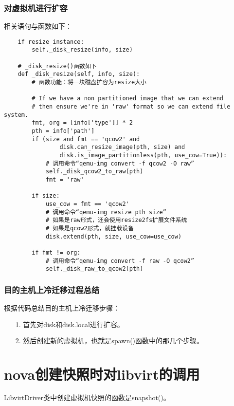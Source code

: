 \documentclass[a4paper,left=1.5cm,right=1.5cm,11pt]{article}
\begin{document}
\subsubsection{对虚拟机进行扩容}
	相关语句与函数如下：
	\begin{lstlisting}
	if resize_instance:
		self._disk_resize(info, size)

	# _disk_resize()函数如下
	def _disk_resize(self, info, size):
        # 函数功能：将一块磁盘扩容为resize大小

		# If we have a non partitioned image that we can extend
        # then ensure we're in 'raw' format so we can extend file system.
        fmt, org = [info['type']] * 2
        pth = info['path']
        if (size and fmt == 'qcow2' and
                disk.can_resize_image(pth, size) and
                disk.is_image_partitionless(pth, use_cow=True)):
			# 调用命令“qemu-img convert -f qcow2 -O raw”
            self._disk_qcow2_to_raw(pth)
            fmt = 'raw'

        if size:
            use_cow = fmt == 'qcow2'
			# 调用命令“qemu-img resize pth size”
			# 如果是raw形式，还会使用resize2fs扩展文件系统
			# 如果是qcow2形式，就挂载设备
            disk.extend(pth, size, use_cow=use_cow)

        if fmt != org:
            # 调用命令“qemu-img convert -f raw -O qcow2”
            self._disk_raw_to_qcow2(pth)
	\end{lstlisting}

\subsubsection{目的主机上冷迁移过程总结}
	根据代码总结目的主机上冷迁移步骤：
	\begin{itemize}
		\item[1.] 首先对disk和disk.local进行扩容。
		\item[2.] 然后创建新的虚拟机，也就是spawn()函数中的那几个步骤。
	\end{itemize}

\clearpage

\section{nova创建快照时对libvirt的调用}
	LibvirtDriver类中创建虚拟机快照的函数是snapshot()。\par
\end{document}

